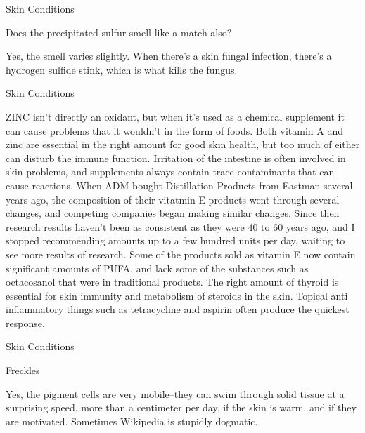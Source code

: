 \documentclass[11pt,oneside,openany,extrafontsizes]{memoir}
\begin{document}
\begin{qaexchange}{Skin Conditions}

    \begin{question}
        Does the precipitated sulfur smell like a match also?
    \end{question}

    \begin{answer}
        Yes, the smell varies slightly. When there's a skin fungal infection, there's a hydrogen sulfide stink, which is what kills the fungus.
    \end{answer}
\end{qaexchange}

\begin{standalonequote}{Skin Conditions}

    \begin{answer}
        ZINC isn't directly an oxidant, but when it's used as a chemical supplement it can cause problems that it wouldn't in the form of foods. Both vitamin A and zinc are essential in the right amount for good skin health, but too much of either can disturb the immune function. Irritation of the intestine is often involved in skin problems, and supplements always contain trace contaminants that can cause reactions. When ADM bought Distillation Products from Eastman several years ago, the composition of their vitatmin E products went through several changes, and competing companies began making similar changes. Since then research results haven't been as consistent as they were 40 to 60 years ago, and I stopped recommending amounts up to a few hundred units per day, waiting to see more results of research. Some of the products sold as vitamin E now contain significant amounts of PUFA, and lack some of the substances such as octacosanol that were in traditional products. The right amount of thyroid is essential for skin immunity and metabolism of steroids in the skin. Topical anti inflammatory things such as tetracycline and aspirin often produce the quickest response.
    \end{answer}
\end{standalonequote}

\begin{standalonequote}{Skin Conditions}
    \begin{note}
        Freckles
    \end{note}

    \begin{answer}
        Yes, the pigment cells are very mobile--they can swim through solid tissue at a surprising speed, more than a centimeter per day, if the skin is warm, and if they are motivated. Sometimes Wikipedia is stupidly dogmatic.
    \end{answer}
\end{standalonequote}
\end{document}
